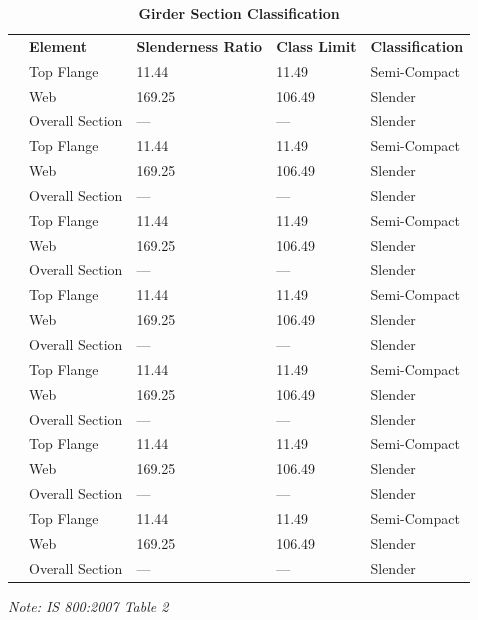 \documentclass[12pt,a4paper]{report}
\numberwithin{table}{chapter}
\numberwithin{figure}{chapter}
\begin{document}
\vspace{1em}
\begin{longtable}{|C{2.5cm}|L{3cm}|C{3.5cm}|C{2.5cm}|>{\centering\arraybackslash}p{4.0cm}|}
\caption{\textbf{Girder Section Classification}} \\
\hline
\endfirsthead
\hline
\caption{\textbf{Girder Section Classification}} \\
\hline
\endhead
\textbf{} & \textbf{Element} & \textbf{Slenderness Ratio} & \textbf{Class Limit} & \textbf{Classification} \\[6pt]
\hline
{} & Top Flange & 11.44 & 11.49 & Semi-Compact \\[6pt]
 & Web & 169.25 & 106.49 & Slender \\[6pt]
 & Overall Section & --- & --- & Slender \\[6pt]
\hline
{} & Top Flange & 11.44 & 11.49 & Semi-Compact \\[6pt]
 & Web & 169.25 & 106.49 & Slender \\[6pt]
 & Overall Section & --- & --- & Slender \\[6pt]
\hline
{} & Top Flange & 11.44 & 11.49 & Semi-Compact \\[6pt]
 & Web & 169.25 & 106.49 & Slender \\[6pt]
 & Overall Section & --- & --- & Slender \\[6pt]
\hline
{} & Top Flange & 11.44 & 11.49 & Semi-Compact \\[6pt]
 & Web & 169.25 & 106.49 & Slender \\[6pt]
 & Overall Section & --- & --- & Slender \\[6pt]
\hline
{} & Top Flange & 11.44 & 11.49 & Semi-Compact \\[6pt]
 & Web & 169.25 & 106.49 & Slender \\[6pt]
 & Overall Section & --- & --- & Slender \\[6pt]
\hline
{} & Top Flange & 11.44 & 11.49 & Semi-Compact \\[6pt]
 & Web & 169.25 & 106.49 & Slender \\[6pt]
 & Overall Section & --- & --- & Slender \\[6pt]
\hline
{} & Top Flange & 11.44 & 11.49 & Semi-Compact \\[6pt]
 & Web & 169.25 & 106.49 & Slender \\[6pt]
 & Overall Section & --- & --- & Slender \\[6pt]
\hline
\end{longtable}
\noindent\textit{Note: IS 800:2007 Table 2}
\end{document}
